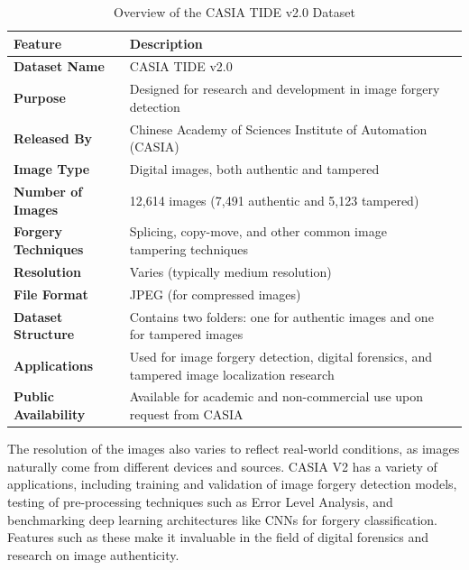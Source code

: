 \documentclass{ieeeaccess}
\begin{document}
	\begin{table}[h!]
		\centering
		\setlength{\tabcolsep}{3pt}
		\vspace{3mm}
		\begin{tabular}{|p{75pt}|p{150pt}|p{115pt}|}
			\hline
			\textbf{Feature}            & \textbf{Description}                                                                 \\ \hline
			\textbf{Dataset Name}       & CASIA TIDE v2.0                                                                      \\ \hline
			\textbf{Purpose}            & Designed for research and development in image forgery detection                     \\ \hline
			\textbf{Released By}        & Chinese Academy of Sciences Institute of Automation (CASIA)                          \\ \hline
			\textbf{Image Type}         & Digital images, both authentic and tampered                                          \\ \hline
			\textbf{Number of Images}   & 12,614 images (7,491 authentic and 5,123 tampered)                                   \\ \hline
			\textbf{Forgery Techniques} & Splicing, copy-move, and other common image tampering techniques                      \\ \hline
			\textbf{Resolution}         & Varies (typically medium resolution)                                                 \\ \hline
			\textbf{File Format}        & JPEG (for compressed images)                                                         \\ \hline
			\textbf{Dataset Structure}  & Contains two folders: one for authentic images and one for tampered images           \\ \hline
			\textbf{Applications}       & Used for image forgery detection, digital forensics, and tampered image localization research \\ \hline
			\textbf{Public Availability} & Available for academic and non-commercial use upon request from CASIA               \\ \hline
		\end{tabular}
		\caption{Overview of the CASIA TIDE v2.0 Dataset}
		\label{casiav2overview}
	\end{table}
	
	
	The resolution of the images also varies to reflect real-world conditions, as images naturally come from different devices and sources. CASIA V2 has a variety of applications, including training and validation of image forgery detection models, testing of pre-processing techniques such as Error Level Analysis, and benchmarking deep learning architectures like CNNs for forgery classification. Features such as these make it invaluable in the field of digital forensics and research on image authenticity.
	
\end{document}
